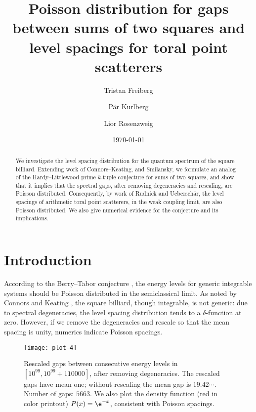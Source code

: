 \documentclass[12pt, reqno, twoside, letterpaper]{amsart}
\title[Poisson spacings between sums of two squares]
      {Poisson distribution for gaps between sums of two
       squares and level spacings for toral point scatterers}
\author[T.\ Freiberg]{Tristan Freiberg}
\author[P.\ Kurlberg]{P\"ar Kurlberg}
\author[L.\ Rosenzweig]{Lior Rosenzweig}
\date{\today}
\begin{document}

\begin{abstract} 
%
We investigate the level spacing distribution for the quantum
spectrum of the square billiard.  
%
Extending work of Connors--Keating, and Smilansky, we formulate 
an analog of the Hardy--Littlewood prime $k$-tuple conjecture 
for sums of two squares, and show that it implies that the 
spectral gaps, after removing degeneracies and rescaling, are 
Poisson distributed.  
%
Consequently, by work of Rudnick and Uebersch\"ar, the level 
spacings of arithmetic toral point scatterers, in the weak 
coupling limit, are also Poisson distributed.
%
We also give numerical evidence for the conjecture and its 
implications.
%
\end{abstract}

\maketitle


\section{Introduction}
 \label{sec:intro}

According to the Berry--Tabor conjecture \cite{BT:77}, the energy 
levels for generic integrable systems should be Poisson 
distributed in the semiclassical limit.  
%
As noted by Connors and Keating \cite{CK:97}, the square billiard, 
though integrable, is not generic: due to spectral degeneracies, 
the level spacing distribution tends to a $\delta$-function at 
zero.
%
However, if we remove the degeneracies and rescale so that the 
mean spacing is unity, numerics indicate Poisson spacings.

\begin{figure}[ht]
  \centering
\texttt{[image: plot-4]}

\caption{%
  Rescaled gaps between consecutive energy levels in
  $[10^{99}, 10^{99} + 110000]$, after removing degeneracies. 
  The rescaled gaps have mean one; without rescaling
  the mean gap is $19.42\cdots$.
  Number of gaps: $5663$.  
  We also plot the density function (red in color
  printout) $P(x) = \e^{-x}$, consistent with Poisson spacings.
  }
\end{figure}
\end{document}
